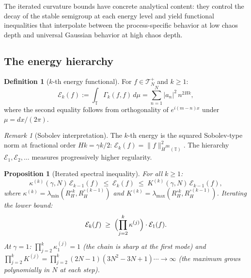 \documentclass[11pt,a4paper]{article}
\theoremstyle{plain}
\newtheorem{proposition}[theorem]{Proposition}
\theoremstyle{definition}
\newtheorem{definition}[theorem]{Definition}
\theoremstyle{remark}
\newtheorem{remark}[theorem]{Remark}
\newcommand{\T}{\mathbb{T}}
\begin{document}
The iterated curvature bounds have concrete analytical
content: they control the decay of the stable semigroup
at each energy level and yield functional inequalities
that interpolate between the process-specific behavior
at low chaos depth and universal Gaussian behavior at
high chaos depth.


\subsection{The energy hierarchy}

\begin{definition}[$k$-th energy functional]
\label{def:energy-k}
For $f \in \mathcal{T}_N^+$ and $k \geq 1$:
\begin{equation}\label{eq:Ek}
  \mathcal{E}_k(f)
  := \int_\T \Gamma_k(f,f)\,d\mu
  = \sum_{n=1}^N |a_n|^2\,n^{2Hk},
\end{equation}
where the second equality follows from orthogonality of
$e^{i(m-n)x}$ under $\mu = dx/(2\pi)$.
\end{definition}

\begin{remark}[Sobolev interpretation]
\label{rem:sobolev}
The $k$-th energy is the squared Sobolev-type norm at
fractional order $Hk = \gamma k/2$:
$\mathcal{E}_k(f) = \|f\|_{\dot{H}^{Hk}(\T)}^2$.
The hierarchy $\mathcal{E}_1, \mathcal{E}_2, \ldots$
measures progressively higher regularity.
\end{remark}

\begin{proposition}[Iterated spectral inequality]
\label{prop:iterated}
For all $k \geq 1$:
\begin{equation}\label{eq:iterated}
  \kappa^{(k)}(\gamma,N)\,\mathcal{E}_{k-1}(f)
  \;\leq\; \mathcal{E}_k(f)
  \;\leq\; K^{(k)}(\gamma,N)\,\mathcal{E}_{k-1}(f),
\end{equation}
where
$\kappa^{(k)} = \lambda_{\min}(R_H^{\circ k}, R_H^{\circ(k-1)})$
and
$K^{(k)} = \lambda_{\max}(R_H^{\circ k}, R_H^{\circ(k-1)})$.
Iterating the lower bound:
\begin{equation}\label{eq:chain}
  \mathcal{E}_k(f)
  \;\geq\; \Bigl(\prod_{j=2}^k \kappa^{(j)}\Bigr)
  \cdot \mathcal{E}_1(f).
\end{equation}
At $\gamma = 1$:
$\prod_{j=2}^k \kappa_1^{(j)} = 1$ (the chain is sharp
at the first mode) and
$\prod_{j=2}^k K^{(j)} = \prod_{j=2}^k (2N-1)(3N^2-3N+1)
\cdots \to \infty$ (the maximum grows polynomially in $N$
at each step).
\end{proposition}
\end{document}
